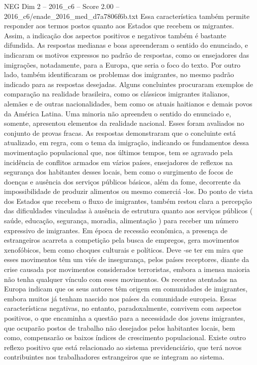 \begin{textsample}{NEG Dim 2 – 2016\_c6 – Score 2.00 – 2016\_c6/enade\_2016\_med\_d7a7806f6b.txt}
Essa característica também permite responder aos termos postos quanto aos Estados que recebem os migrantes.
Assim, a indicação dos aspectos positivos e negativos também é bastante difundida.
As respostas medianas e boas apreenderam o sentido do enunciado, e indicaram os motivos expressos no padrão de respostas, como os ensejadores das imigrações, notadamente, para a Europa, que seria o foco do texto.
Por outro lado, também identificaram os problemas dos imigrantes, no mesmo padrão indicado para as respostas desejadas.
Alguns concluintes procuraram exemplos de comparação na realidade brasileira, como os clássicos imigrantes italianos, alemães e de outras nacionalidades, bem como os atuais haitianos e demais povos da América Latina.
Uma minoria não apreendeu o sentido do enunciado e, somente, apresentou elementos da realidade nacional.
Esses foram avaliados no conjunto de provas fracas.
As respostas demonstraram que o concluinte está atualizado, em regra, com o tema da imigração, indicando os fundamentos dessa movimentação populacional que, nos últimos tempos, tem se agravado pela incidência de conflitos armados em vários países, ensejadores de reflexos na segurança dos habitantes desses locais, bem como o surgimento de focos de doenças e ausência dos serviços públicos básicos, além da fome, decorrente da impossibilidade de produzir alimentos ou mesmo comerciá -los.
Do ponto de vista dos Estados que recebem o fluxo de imigrantes, também restou clara a percepção das dificuldades vinculadas à ausência de estrutura quanto aos serviços públicos ( saúde, educação, segurança, moradia, alimentação ) para receber um número expressivo de imigrantes.
Em época de recessão econômica, a presença de estrangeiros acarreta a competição pela busca de empregos, gera movimentos xenofóbicos, bem como choques culturais e políticos.
Deve -se ter em mira que esses movimentos têm um viés de insegurança, pelos países receptores, diante da crise causada por movimentos considerados terroristas, embora a imensa maioria não tenha qualquer vínculo com esses movimentos.
Os recentes atentados na Europa indicam que os seus autores têm origem em comunidades de imigrantes, embora muitos já tenham nascido nos países da comunidade europeia.
Essas características negativas, no entanto, paradoxalmente, convivem com aspectos positivos, o que encaminha a questão para a necessidade dos jovens imigrantes, que ocuparão postos de trabalho não desejados pelos habitantes locais, bem como, compensarão os baixos índices de crescimento populacional.
Existe outro reflexo positivo que está relacionado ao sistema previdenciário, que terá novos contribuintes nos trabalhadores estrangeiros que se integram ao sistema.

\end{textsample}
